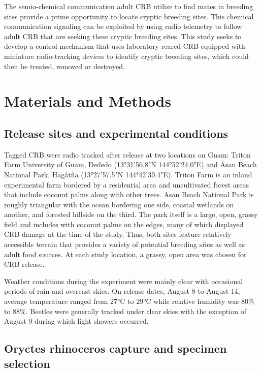 \documentclass[11pt,letterpaper]{scrartcl}
\begin{document}
The semio-chemical communication adult CRB utilize to find mates in breeding sites provide a prime opportunity to locate cryptic breeding sites. This chemical communication signaling can be exploited by using radio telemetry to follow adult CRB that are seeking these cryptic breeding sites. This study seeks to develop a control mechanism that uses laboratory-reared CRB equipped with miniature radio-tracking devices to identify cryptic breeding sites, which could then be treated, removed or destroyed. 

\section*{Materials and Methods}

\subsection*{Release sites and experimental conditions} 

Tagged CRB were radio tracked after release at two locations on Guam: Triton Farm University of Guam, Dededo (13°31'56.8"N 144°52'24.0"E) and Asan Beach National Park, Hagåtña (13°27'57.5"N 144°42'39.4"E). Triton Farm is an inland experimental farm bordered by a residential area and uncultivated forest areas that include coconut palms along with other trees. Asan Beach National Park is roughly triangular with the ocean bordering one side, coastal wetlands on another, and forested hillside on the third. The park itself is a large, open, grassy field and includes with coconut palms on the edges, many of which displayed CRB damage at the time of the study. Thus, both sites feature relatively accessible terrain that provides a variety of potential breeding sites as well as adult food sources. At each study location, a grassy, open area was chosen for CRB release.

Weather conditions during the experiment were mainly clear with occasional periods of rain and overcast skies. On release dates, August 8 to August 14, average temperature ranged from 27°C to 29°C while relative humidity was 80\% to 88\%. Beetles were generally tracked under clear skies with the exception of August 9 during which light showers occurred. 

\subsection*{Oryctes rhinoceros capture and specimen selection}
\end{document}
